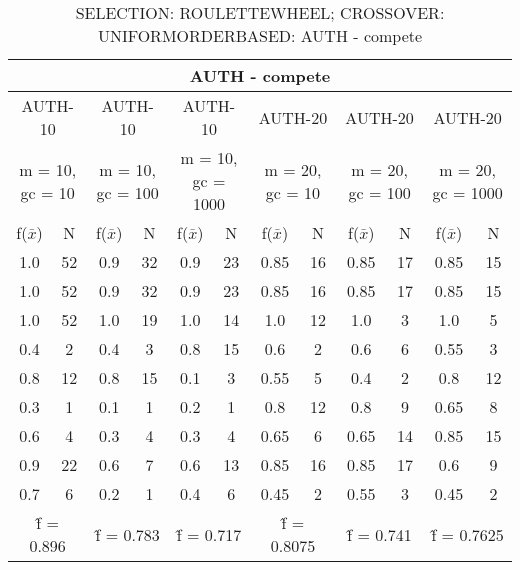 \begin{table}[H]
	\centering
	\caption{SELECTION: ROULETTEWHEEL; CROSSOVER: UNIFORMORDERBASED: AUTH - compete}
	\begin{adjustbox}{width=1\textwidth}
		\begin{tabular}{ |c|c||c|c||c|c||c|c||c|c||c|c| }
			\hline
			\multicolumn{12}{|c|}{AUTH - compete} \\
			\hline
			\multicolumn{2}{|c||}{AUTH-10} & \multicolumn{2}{c||}{AUTH-10} & \multicolumn{2}{c||}{AUTH-10} & \multicolumn{2}{c||}{AUTH-20} & \multicolumn{2}{c||}{AUTH-20} & \multicolumn{2}{c|}{AUTH-20}\\
			\hline
			\multicolumn{2}{|c||}{m = 10, gc = 10} & \multicolumn{2}{c||}{m = 10, gc = 100} & \multicolumn{2}{c||}{m = 10, gc = 1000} & \multicolumn{2}{c||}{m = 20, gc = 10} & \multicolumn{2}{c||}{m = 20, gc = 100} & \multicolumn{2}{c|}{m = 20, gc = 1000}\\
			\hline
			f($\bar{x}$) & N & f($\bar{x}$) & N & f($\bar{x}$) & N & f($\bar{x}$) & N & f($\bar{x}$) & N & f($\bar{x}$) & N\\
			\hline
			\hline
			1.0 & 52 & 0.9 & 32 & 0.9 & 23 & 0.85 & 16 & 0.85 & 17 & 0.85 & 15\\
			\hline
			1.0 & 52 & 0.9 & 32 & 0.9 & 23 & 0.85 & 16 & 0.85 & 17 & 0.85 & 15\\
			1.0 & 52 & 1.0 & 19 & 1.0 & 14 & 1.0 & 12 & 1.0 & 3 & 1.0 & 5\\
			0.4 & 2 & 0.4 & 3 & 0.8 & 15 & 0.6 & 2 & 0.6 & 6 & 0.55 & 3\\
			0.8 & 12 & 0.8 & 15 & 0.1 & 3 & 0.55 & 5 & 0.4 & 2 & 0.8 & 12\\
			0.3 & 1 & 0.1 & 1 & 0.2 & 1 & 0.8 & 12 & 0.8 & 9 & 0.65 & 8\\
			0.6 & 4 & 0.3 & 4 & 0.3 & 4 & 0.65 & 6 & 0.65 & 14 & 0.85 & 15\\
			0.9 & 22 & 0.6 & 7 & 0.6 & 13 & 0.85 & 16 & 0.85 & 17 & 0.6 & 9\\
			0.7 & 6 & 0.2 & 1 & 0.4 & 6 & 0.45 & 2 & 0.55 & 3 & 0.45 & 2\\
			\hline
			\multicolumn{2}{|c||}{\^{f} = 0.896} & \multicolumn{2}{c||}{\^{f} = 0.783} & \multicolumn{2}{c||}{\^{f} = 0.717} & \multicolumn{2}{c||}{\^{f} = 0.8075} & \multicolumn{2}{c||}{\^{f} = 0.741} & \multicolumn{2}{c|}{\^{f} = 0.7625}\\
			\hline
		\end{tabular}
	\end{adjustbox}
\end{table}
